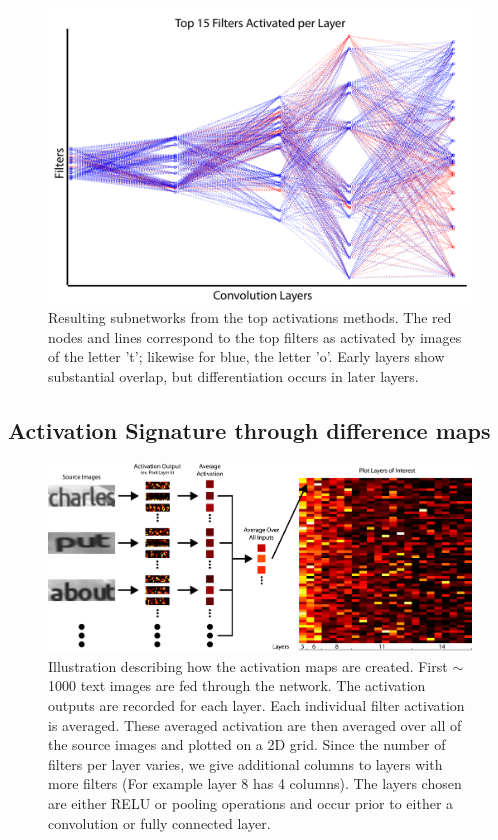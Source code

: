 \documentclass[10pt,twocolumn,letterpaper]{article}
\begin{document}
\begin{figure}
\includegraphics[width=\columnwidth]{Figures/max_activations/max_activations-01.png}
\caption{Resulting subnetworks from the top activations methods. The red nodes and lines correspond to the top filters as activated by images of the letter 't'; likewise for blue, the letter 'o'. Early layers show substantial overlap, but differentiation occurs in later layers.}
\label{fig:activationgraph}
\end{figure}


\subsection{Activation Signature through difference maps} \label{sec:subnetwork}
\begin{figure}
\centering
\includegraphics[width=1\textwidth]{Figures/activations_map_overview/act_map_overview-01.png}
\caption{Illustration describing how the activation maps are created. First $\sim$1000 text images are fed through the network. The activation outputs are recorded for each layer. Each individual filter activation is averaged. These averaged activation are then averaged over all of the source images and plotted on a 2D grid. Since the number of filters per layer varies, we give additional columns to layers with more filters (For example layer 8 has 4 columns). The layers chosen are either RELU or pooling operations and occur prior to either a convolution or fully connected layer.}
\label{fig:subvis}
\end{figure}
\end{document}
